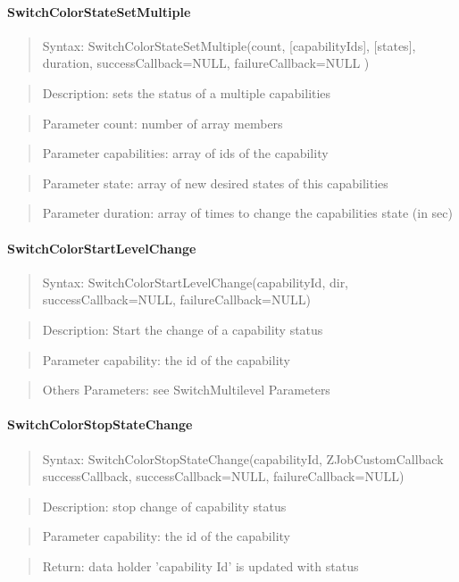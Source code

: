 \paragraph {SwitchColorStateSetMultiple}
\begin{quote} Syntax: SwitchColorStateSetMultiple(count, [capabilityIds], [states], duration, successCallback=NULL, failureCallback=NULL )\end{quote}
\begin{quote} Description: sets the status of a multiple capabilities\end{quote}
\begin{quote} Parameter count: number of array members\end{quote}
\begin{quote} Parameter capabilities: array of ids of the capability\end{quote}
\begin{quote} Parameter state: array of new desired states of this capabilities\end{quote}
\begin{quote} Parameter duration: array of times to change the capabilities state (in sec)\end{quote}

\paragraph {SwitchColorStartLevelChange}
\begin{quote} Syntax: SwitchColorStartLevelChange(capabilityId, dir, successCallback=NULL, failureCallback=NULL)\end{quote}
\begin{quote} Description: Start the change of a capability status\end{quote}
\begin{quote} Parameter capability: the id of the capability\end{quote}
\begin{quote} Others Parameters: see SwitchMultilevel Parameters\end{quote} 

\paragraph {SwitchColorStopStateChange}
\begin{quote} Syntax: SwitchColorStopStateChange(capabilityId, ZJobCustomCallback successCallback, successCallback=NULL, failureCallback=NULL)\end{quote}
\begin{quote} Description: stop change of capability status\end{quote}
\begin{quote} Parameter capability: the id of the capability\end{quote}
\begin{quote} Return: data holder 'capability Id' is updated with status \end{quote}




